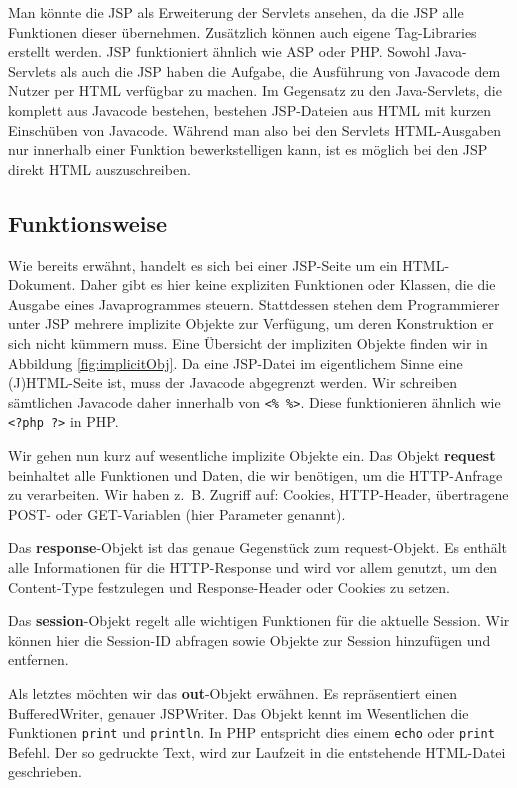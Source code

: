 Man könnte die JSP als Erweiterung der Servlets ansehen, da die JSP alle Funktionen dieser übernehmen. Zusätzlich können auch eigene Tag-Libraries erstellt werden. JSP funktioniert ähnlich wie ASP oder PHP. Sowohl Java-Servlets als auch die JSP haben die Aufgabe, die Ausführung von Javacode dem Nutzer per HTML verfügbar zu machen. Im Gegensatz zu den Java-Servlets, die komplett aus Javacode bestehen, bestehen JSP-Dateien aus HTML mit kurzen Einschüben von Javacode. Während man also bei den Servlets HTML-Ausgaben nur innerhalb einer Funktion bewerkstelligen kann, ist es möglich bei den JSP direkt HTML auszuschreiben.

\subsection{Funktionsweise}

Wie bereits erwähnt, handelt es sich bei einer JSP-Seite um ein HTML-Dokument. Daher gibt es hier keine expliziten Funktionen oder Klassen, die die Ausgabe eines Javaprogrammes steuern. Stattdessen stehen dem Programmierer unter JSP mehrere implizite Objekte zur Verfügung, um deren Konstruktion er sich nicht kümmern muss. Eine Übersicht der impliziten Objekte finden wir in Abbildung \ref{fig:implicitObj}. Da eine JSP-Datei im eigentlichem Sinne eine (J)HTML-Seite ist, muss der Javacode abgegrenzt werden. Wir schreiben sämtlichen Javacode daher innerhalb von \verb|<% %>|. Diese funktionieren ähnlich wie \verb|<?php ?>| in PHP.

Wir gehen nun kurz auf wesentliche implizite Objekte ein. Das Objekt \textbf{request} beinhaltet alle Funktionen und Daten, die wir benötigen, um die HTTP-Anfrage zu verarbeiten. Wir haben \mbox{z. B.} Zugriff auf: Cookies, HTTP-Header, übertragene POST- oder GET-Variablen (hier Parameter genannt).

Das \textbf{response}-Objekt ist das genaue Gegenstück zum request-Objekt. Es enthält alle Informationen für die HTTP-Response und wird vor allem genutzt, um den Content-Type festzulegen und Response-Header oder Cookies zu setzen. 

Das \textbf{session}-Objekt regelt alle wichtigen Funktionen für die aktuelle Session. Wir können hier die Session-ID abfragen sowie Objekte zur Session hinzufügen und entfernen.

Als letztes möchten wir das \textbf{out}-Objekt erwähnen. Es repräsentiert einen BufferedWriter, genauer JSPWriter. Das Objekt kennt im Wesentlichen die Funktionen \verb|print| und \verb|println|. In PHP entspricht dies einem \verb|echo| oder \verb|print| Befehl. Der so gedruckte Text, wird zur Laufzeit in die entstehende HTML-Datei geschrieben. 

